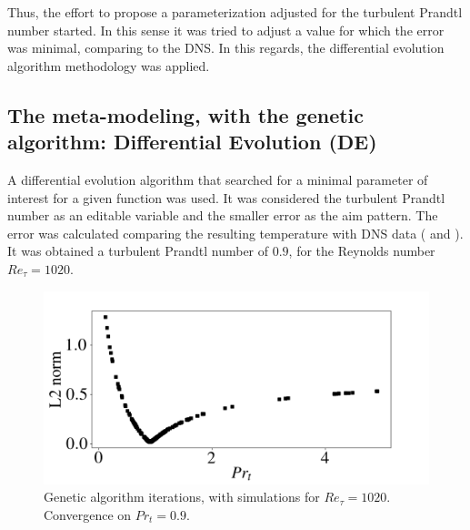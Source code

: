 \documentclass[10pt]{article} %
\begin{document}
Thus, the effort to propose a parameterization adjusted for the turbulent Prandtl number started.
In this sense it was tried to adjust a value for which the error was minimal, comparing to the DNS. In this regards, the differential evolution algorithm methodology was applied. 


\subsection{The meta-modeling, with the genetic algorithm: Differential Evolution (DE)}
A differential evolution algorithm \cite{diferential} that searched for a minimal parameter of interest for a given function was used. It was considered the turbulent Prandtl number as an editable variable and the smaller error as the aim pattern.
The error was calculated comparing the resulting temperature with DNS data (\cite{DNS1020} and \cite{DNS150}).
It was obtained a turbulent Prandtl number of $ 0.9$, for the Reynolds number $ Re_\tau = 1020$.
\begin{figure}[!h]
	\centering
	\includegraphics[angle=0, scale=0.31]{fotos_formatacao_final/Genetic_amostra}
	\caption{Genetic algorithm iterations, with simulations for $Re_\tau = 1020$. Convergence on $Pr_t = 0.9 $.}
\end{figure}
\end{document}
